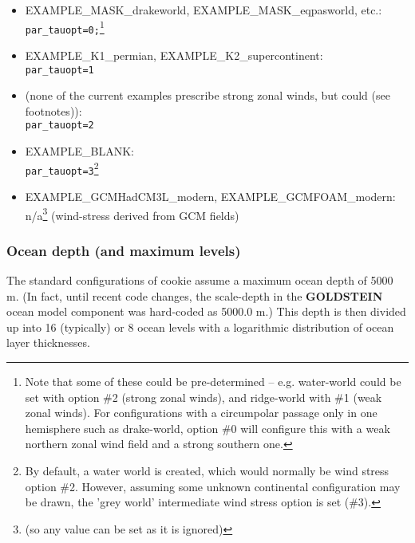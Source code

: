 \vspace{1mm}
\begin{itemize}
\item \textsf{\footnotesize EXAMPLE\_MASK\_drakeworld}, \textsf{\footnotesize EXAMPLE\_MASK\_eqpasworld}, etc.:
\\\texttt{par\_tauopt=0;}\footnote{Note that some of these could be pre-determined -- e.g. water-world could be set with option \#2 (strong zonal winds), and ridge-world with \#1 (weak zonal winds). For configurations with a circumpolar passage only in one hemisphere such as drake-world, option \#0 will configure this with a weak northern zonal wind field and a strong southern one.}
\item \textsf{\footnotesize EXAMPLE\_K1\_permian}, \textsf{\footnotesize EXAMPLE\_K2\_supercontinent}:
\\\texttt{par\_tauopt=1}
\item (none of the current examples prescribe strong zonal winds, but could (see footnotes)):
\\\texttt{par\_tauopt=2}
\item \textsf{\footnotesize EXAMPLE\_BLANK}:
\\\texttt{par\_tauopt=3}\footnote{By default, a water world is created, which would normally be wind stress option \#2. However, assuming some unknown continental configuration may be drawn, the 'grey world' intermediate wind stress option is set (\#3).}
\item \textsf{\footnotesize EXAMPLE\_GCMHadCM3L\_modern}\normalsize, \textsf{\footnotesize EXAMPLE\_GCMFOAM\_modern}\normalsize:
\\n/a\footnote{(so any value can be set as it is ignored)} (wind-stress derived from GCM fields)
\end{itemize}
\vspace{1mm}


\subsubsection{Ocean depth (and maximum levels)}

The standard configurations of cookie assume a maximum ocean depth of 5000 m. (In fact, until recent code changes, the scale-depth in the \textbf{GOLDSTEIN} ocean model component was hard-coded as 5000.0 m.) This depth is then divided up into 16 (typically) or 8 ocean levels with a logarithmic distribution of ocean layer thicknesses.


